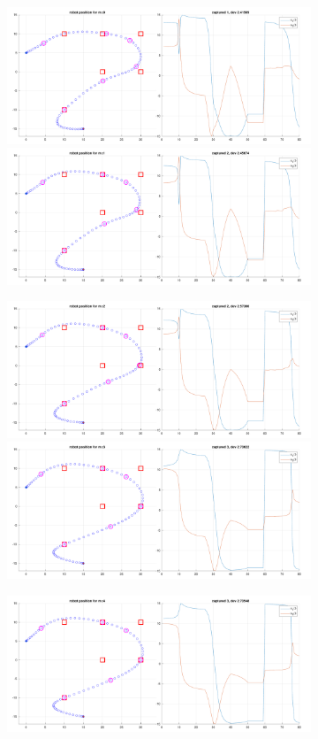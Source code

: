 \begin{figure}[!htb]
    \begin{subfigure}
        \centering
        \includegraphics[width=0.5\linewidth]{part1/figures/task11/task_11_0.pdf}\hspace{0em}
        \includegraphics[width=0.5\linewidth]{part1/figures/task11/task_11_1.pdf}
    \end{subfigure}
    \begin{subfigure}
        \centering
        \includegraphics[width=0.5\linewidth]{part1/figures/task11/task_11_2.pdf}\hspace{0em}
        \includegraphics[width=0.5\linewidth]{part1/figures/task11/task_11_3.pdf}
    \end{subfigure}
    \begin{subfigure}
        \centering
        \includegraphics[width=0.5\linewidth]{part1/figures/task11/task_11_4.pdf}\hspace{0em}

\end{subfigure}
\end{figure}
